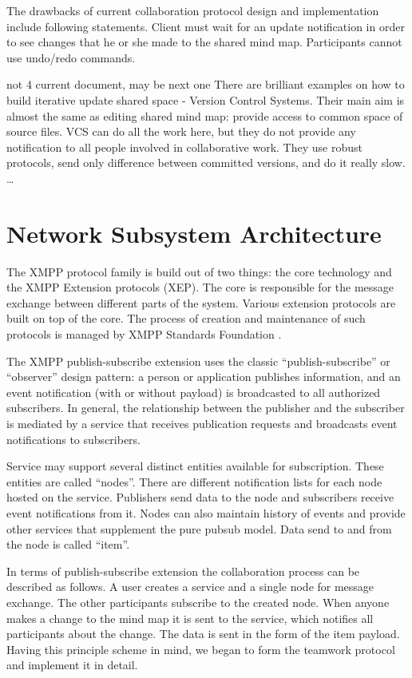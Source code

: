  The drawbacks of current collaboration protocol design and implementation
 include following statements. Client must wait for an update notification in
 order to see changes that he or she made to the shared mind map. Participants
 cannot use undo/redo commands.

 not 4 current document, may be next one
 There are brilliant examples on how to build iterative update shared space -
 Version Control Systems. Their main aim is almost the same as editing shared
 mind map: provide access to common space of source files. VCS can do all the 
 work here, but they do not provide any notification to all people involved in
 collaborative work. They use robust protocols, send only difference between
 committed versions, and do it really slow. \ldots

\section{Network Subsystem Architecture}

The XMPP protocol family is build out of two things: the core technology and the
XMPP Extension protocols (XEP). The core is responsible for the message exchange
between different parts of the system. Various extension protocols are built on
top of the core. The process of creation and maintenance of such protocols is
managed by XMPP Standards Foundation \cite{xmpp-standarts}.

The XMPP publish-subscribe extension \cite{xep-0060} uses the classic
``publish-subscribe'' or ``observer'' design pattern: a person or application
publishes information, and an event notification (with or without payload) is
broadcasted to all authorized subscribers. In general, the relationship between
the publisher and the subscriber is mediated by a service that receives
publication requests and broadcasts event notifications to subscribers.

Service may support several distinct entities available for subscription. These
entities are called ``nodes''. There are different notification lists for each
node hosted on the service. Publishers send data to the node and subscribers
receive event notifications from it. Nodes can also maintain history of events
and provide other services that supplement the pure pubsub model. Data send to
and from the node is called ``item''.

In terms of publish-subscribe extension the collaboration process can be
described as follows. A user creates a service and a single node for message
exchange. The other participants subscribe to the created node. When anyone
makes a change to the mind map it is sent to the service, which notifies all
participants about the change. The data is sent in the form of the item
payload. Having this principle scheme in mind, we began to form the teamwork
protocol and implement it in detail.

